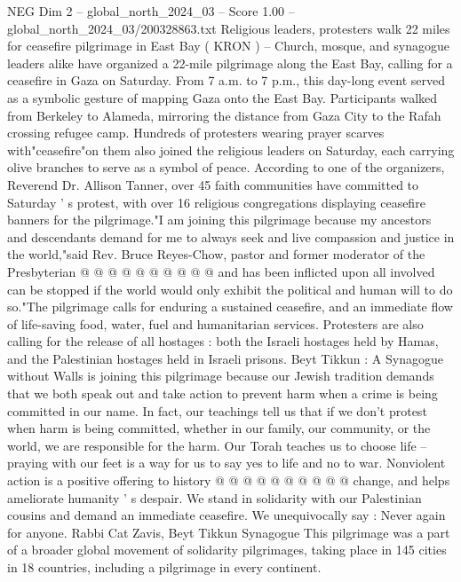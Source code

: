 \begin{textsample}{NEG Dim 2 – global\_north\_2024\_03 – Score 1.00 – global\_north\_2024\_03/200328863.txt}  \label{ex:f2_neg_080}
Religious leaders, protesters walk 22 miles for ceasefire pilgrimage in East Bay ( KRON ) -- Church, mosque, and synagogue leaders alike have organized a 22-mile pilgrimage along the East Bay, calling for a ceasefire in Gaza on Saturday.
From 7 a.m. to 7 p.m., this day-long event served as a symbolic gesture of mapping Gaza onto the East Bay.
Participants walked from Berkeley to Alameda, mirroring the distance from Gaza City to the Rafah crossing refugee camp.
Hundreds of protesters wearing prayer scarves with"ceasefire"on them also joined the religious leaders on Saturday, each carrying olive branches to serve as a symbol of peace.
According to one of the organizers, Reverend Dr.
Allison Tanner, over 45 faith communities have committed to Saturday ' s protest, with over 16 religious congregations displaying ceasefire banners for the pilgrimage."I am joining this pilgrimage because my ancestors and descendants demand for me to always seek and live compassion and justice in the world,"said Rev.
Bruce Reyes-Chow, pastor and former moderator of the Presbyterian @ @ @ @ @ @ @ @ @ @ and has been inflicted upon all involved can be stopped if the world would only exhibit the political and human will to do so."The pilgrimage calls for enduring a sustained ceasefire, and an immediate flow of life-saving food, water, fuel and humanitarian services.
Protesters are also calling for the release of all hostages : both the Israeli hostages held by Hamas, and the Palestinian hostages held in Israeli prisons.
Beyt Tikkun : A Synagogue without Walls is joining this pilgrimage because our Jewish tradition demands that we both speak out and take action to prevent harm when a crime is being committed in our name.
In fact, our teachings tell us that if we don't protest when harm is being committed, whether in our family, our community, or the world, we are responsible for the harm.
Our Torah teaches us to choose life -- praying with our feet is a way for us to say yes to life and no to war.
Nonviolent action is a positive offering to history @ @ @ @ @ @ @ @ @ @ change, and helps ameliorate humanity ' s despair.
We stand in solidarity with our Palestinian cousins and demand an immediate ceasefire.
We unequivocally say : Never again for anyone.
Rabbi Cat Zavis, Beyt Tikkun Synagogue This pilgrimage was a part of a broader global movement of solidarity pilgrimages, taking place in 145 cities in 18 countries, including a pilgrimage in every continent.

\end{textsample}
